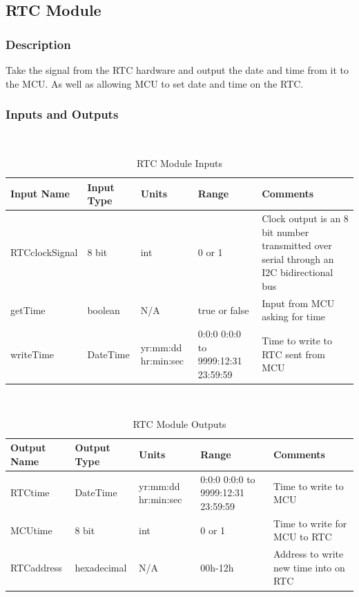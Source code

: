 \documentclass[12pt,titlepage]{article}
\begin{document}
\subsection{RTC Module}
\subsubsection*{Description}
Take the signal from the RTC hardware and output the date and time from it to the MCU. As well as allowing MCU to set date and time on the RTC.
\subsubsection*{Inputs and Outputs}
$ $\\
\begin{table}[ht!]
\begin{center}
\begin{adjustbox}{max width=\textwidth}
\small
\begin{tabular}{|p{}|p{}|p{}|p{}|p{}|}
 \hline
 \textbf{Input Name} & \textbf{Input Type} & \textbf{Units} &\textbf{Range} & \textbf{Comments} \\
 \hline 
 RTCclockSignal  & 8 bit  & int & 0 or 1 & Clock output is an 8 bit number transmitted over serial through an I2C bidirectional bus \\
 \hline
  getTime  &  boolean & N/A & true or false & Input from MCU asking for time \\
 \hline
 writeTime  & DateTime  & yr:mm:dd hr:min:sec & 0:0:0 0:0:0 to 9999:12:31 23:59:59 & Time to write to RTC sent from MCU \\
 \hline
\end{tabular}
\end{adjustbox}
\end{center}
\caption{RTC Module Inputs}
\end{table}
  \\

\begin{table}[ht!]
\begin{center}
\begin{adjustbox}{max width=\textwidth}
\small
\begin{tabular}{|p{}|p{}|p{}|p{}|p{}|}
 \hline
 \textbf{Output Name} & \textbf{Output Type} & \textbf{Units} &\textbf{Range} & \textbf{Comments} \\
 \hline 
 RTCtime & DateTime  & yr:mm:dd hr:min:sec & 0:0:0 0:0:0 to 9999:12:31 23:59:59 & Time to write to MCU \\
 \hline
 MCUtime & 8 bit  & int & 0 or 1 & Time to write for MCU to RTC \\
 \hline
 RTCaddress & hexadecimal  & N/A & 00h-12h & Address to write new time into on RTC \\
 \hline
\end{tabular}
\end{adjustbox}
\end{center}
\caption{RTC Module Outputs}
\end{table}
\end{document}
